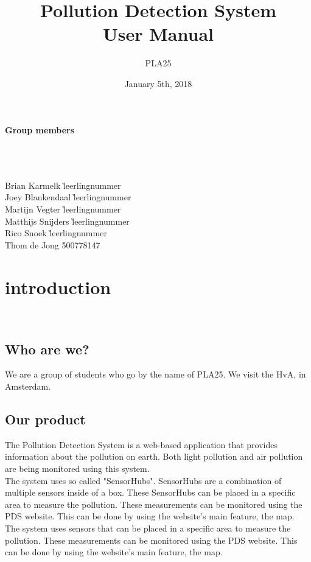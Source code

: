 \documentclass[a4paper]{article}
\title{Pollution Detection System\\User Manual}
\author{PLA25}
\date{January 5th, 2018}
\begin{document}
\clearpage
\maketitle
\vspace*{\fill}
\paragraph{Group members}
~\\\\
\begin{tabbing}
Brian Karmelk \` leerlingnummer
\\
Joey Blankendaal \` leerlingnummer
\\
Martijn Vegter \` leerlingnummer
\\
Matthijs Snijders \` leerlingnummer
\\
Rico Snoek \` leerlingnummer
\\
Thom de Jong \` 500778147
\end{tabbing}
\thispagestyle{empty}
\setcounter{page}{0}
\pagebreak
\tableofcontents
\pagebreak

\section{introduction}
~\\

\subsection{Who are we?}
We are a group of students who go by the name of PLA25. We visit the HvA, in Amsterdam.
~\\

\subsection{Our product}
The Pollution Detection System is a web-based application that provides information about the pollution on earth. Both light pollution and air pollution are being monitored using this system.
\\
\indent
The system uses so called "SensorHubs". SensorHubs are a combination of multiple sensors inside of a box. These SensorHubs can be placed in a specific area to measure the pollution. These measurements can be monitored using the PDS website. This can be done by using the website's main feature, the map.
The system uses sensors that can be placed in a specific area to measure the pollution. These measurements can be monitored using the PDS website. This can be done by using the website's main feature, the map.
\end{document}
